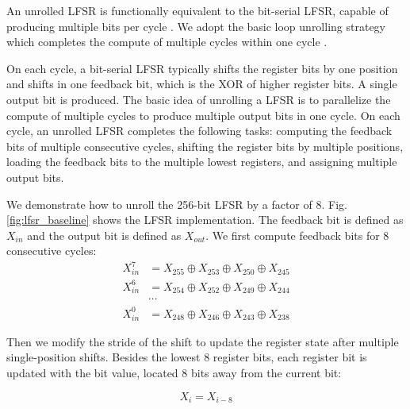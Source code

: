 An unrolled LFSR is functionally equivalent to the bit-serial LFSR, capable of producing multiple bits per cycle %
\cite{cycle_efficient_lfsr, unrolled_lfsr_ref_2}. We adopt the basic loop unrolling strategy which completes the compute of multiple cycles within one cycle \cite{cycle_efficient_lfsr}.%

On each cycle, a bit-serial LFSR typically shifts the register bits by one position and shifts in one feedback bit, which is the XOR of higher register bits. A single output bit is produced. The basic idea of unrolling a LFSR is to parallelize the compute of multiple cycles to produce multiple output bits in one cycle. On each cycle, an unrolled LFSR completes the following tasks: computing the feedback bits of multiple consecutive cycles, shifting the register bits by multiple positions, loading the feedback bits to the multiple lowest registers, and assigning multiple output bits. 

We demonstrate how to unroll the 256-bit LFSR by a factor of 8. Fig. \ref{fig:lfsr_baseline} shows the LFSR implementation. The feedback bit is defined as $X_{in}$ and the output bit is defined as $X_{out}$. %
We first compute feedback bits for 8 consecutive cycles:
\begin{align*}
    X_{in} ^ 7 &=  X_{255} \oplus X_{253} \oplus X_{250} \oplus X_{245} \\
    X_{in} ^ 6 &=  X_{254} \oplus X_{252} \oplus X_{249} \oplus X_{244} \\
    &\cdots \\
    X_{in} ^ 0 &= X_{248} \oplus X_{246} \oplus X_{243} \oplus X_{238}
\end{align*}

Then we modify the stride of the shift to update the register state after multiple single-position shifts. Besides the lowest 8 register bits, each register bit is updated with the bit value, located 8 bits away from the current bit:

\begin{equation*}
    X_{i} = X_{i-8}
\end{equation*}

